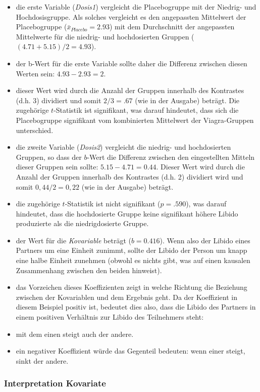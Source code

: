 \documentclass[]{article}
\begin{document}
\begin{itemize}
\item
  die erste Variable (\emph{Dosis1}) vergleicht die Placebogruppe mit der Niedrig- und Hochdosisgruppe. Als solches vergleicht es den angepassten Mittelwert der Placebogruppe (\(\bar{x}_{Placebo} = 2.93\)) mit dem Durchschnitt der angepassten Mittelwerte für die niedrig- und hochdosierten Gruppen (\((4.71+5.15)/2 = 4.93\)).
\item
  der b-Wert für die erste Variable sollte daher die Differenz zwischen diesen Werten sein: \(4.93 - 2.93 = 2\).
\item
  dieser Wert wird durch die Anzahl der Gruppen innerhalb des Kontrastes (d.h. 3) dividiert und somit \(2/3 = .67\) (wie in der Ausgabe) beträgt. Die zugehörige \(t\)-Statistik ist signifikant, was darauf hindeutet, dass sich die Placebogruppe signifikant vom kombinierten Mittelwert der Viagra-Gruppen unterschied.
\item
  die zweite Variable (\emph{Dosis2}) vergleicht die niedrig- und hochdosierten Gruppen, so dass der \(b\)-Wert die Differenz zwischen den eingestellten Mitteln dieser Gruppen sein sollte: \(5.15 - 4.71 = 0.44\). Dieser Wert wird durch die Anzahl der Gruppen innerhalb des Kontrastes (d.h. 2) dividiert wird und somit \(0,44/2 = 0,22\) (wie in der Ausgabe) beträgt.
\item
  die zugehörige \(t\)-Statistik ist nicht signifikant (\(p = .590\)), was darauf hindeutet, dass die hochdosierte Gruppe keine signifikant höhere Libido produzierte als die niedrigdosierte Gruppe.
\item
  der Wert für die \emph{Kovariable} beträgt (\(b = 0.416\)). Wenn also der Libido eines Partners um eine Einheit zunimmt, sollte der Libido der Person um knapp eine halbe Einheit zunehmen (obwohl es nichts gibt, was auf einen kausalen Zusammenhang zwischen den beiden hinweist).
\item
  das Vorzeichen dieses Koeffizienten zeigt in welche Richtung die Beziehung zwischen der Kovariablen und dem Ergebnis geht. Da der Koeffizient in diesem Beispiel positiv ist, bedeutet dies also, dass die Libido des Partners in einem positiven Verhältnis zur Libido des Teilnehmers steht:
\item
  mit dem einen steigt auch der andere.
\item
  ein negativer Koeffizient würde das Gegenteil bedeuten: wenn einer steigt, sinkt der andere.
\end{itemize}

\hypertarget{interpretation-kovariate}{%
\subsubsection*{Interpretation Kovariate}\label{interpretation-kovariate}}
\end{document}
